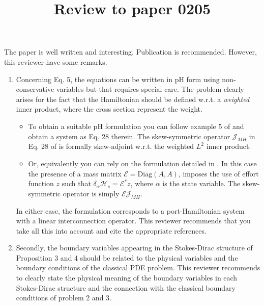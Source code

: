 \documentclass{article}
\title{Review to paper 0205}
\begin{document}
	\maketitle
	
	The paper is well written and interesting. Publication is recommended.
	However, this reviewer have some remarks. 
	\begin{enumerate}
		\item Concerning Eq. 5, the equations can be written in pH form using non-conservative variables but that requires special care. The problem clearly arises for the fact that the Hamiltonian should be defined w.r.t. a \textit{weighted} inner product, where the cross section represent the weight. 
		\begin{itemize}
			\item To obtain a suitable pH formulation you can follow example 5 of \cite{MATIGNONdamp} and obtain a system as Eq. 28 therein. The skew-symmetric operator $\mathcal{J}_{MH}$ in Eq. 28 of \cite{MATIGNONdamp} is formally skew-adjoint w.r.t. the weighted $L^2$ inner product. 
			\item Or, equivalently you can  rely on the formulation detailed in \cite{mehrmann2019structurepreserving}. In this case the presence of a mass matrix $\mathcal{E} = \mathrm{Diag}(A, A)$, imposes the use of effort function $z$ such that $\delta_\alpha \mathcal{H}_s = \mathcal{E}^* z$, where $\alpha$ is the state variable. The skew-symmetric operator is simply $\mathcal{E} \mathcal{J}_{MH}$. 
		\end{itemize}
		In either case, the formulation corresponds to a port-Hamiltonian system with a linear interconnection operator. This reviewer recommends that you take all this into account and cite the appropriate references. 
		\item Secondly, the boundary variables appearing in the Stokes-Dirac structure of Proposition 3 and 4 should be related to the physical variables and the boundary conditions of the classical PDE problem. This reviewer recommends to clearly state the physical meaning  of the boundary variables in each Stokes-Dirac structure and the connection with the classical boundary conditions of problem 2 and 3.
	\end{enumerate}
	
	
	
	
	
	

	
\end{document}
